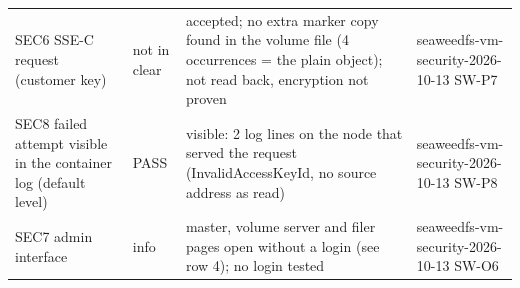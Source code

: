 \begin{tabular}{@{}p{3.6cm}lp{7.4cm}p{3.6cm}@{}}
SEC6 SSE-C request (customer key) & not in clear & accepted; no extra marker copy found in the volume file (4 occurrences = the plain object); not read back, encryption not proven & seaweedfs-vm-security-2026-10-13 SW-P7 \\
SEC8 failed attempt visible in the container log (default level) & PASS & visible: 2 log lines on the node that served the request (InvalidAccessKeyId, no source address as read) & seaweedfs-vm-security-2026-10-13 SW-P8 \\
SEC7 admin interface & info & master, volume server and filer pages open without a login (see row 4); no login tested & seaweedfs-vm-security-2026-10-13 SW-O6 \\
\bottomrule
\end{tabular}
